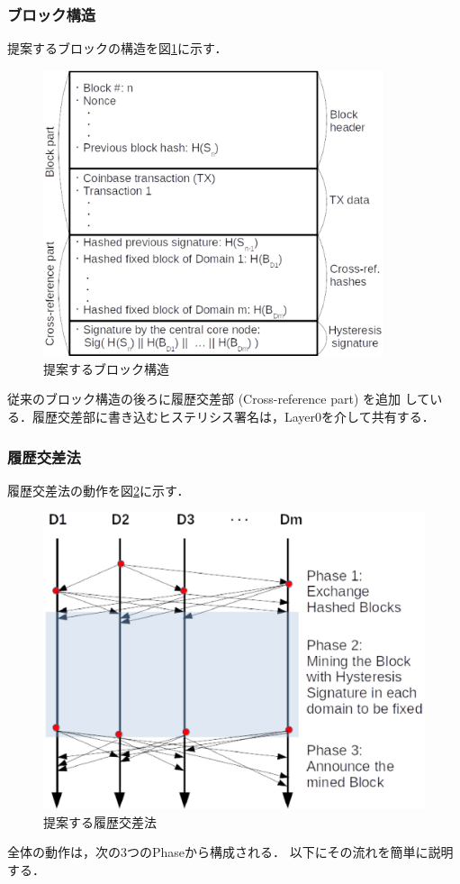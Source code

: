 \documentclass[a4paper,12pt]{jsarticle}
\begin{document}
      \subsubsection{ブロック構造}
提案するブロックの構造を図\ref{fig:block}に示す．
%
\begin{figure}[H]%
  \begin{center}
    \includegraphics[width=100mm]{pht/block_structure.eps}
  \end{center}
  \caption{提案するブロック構造}
  \label{fig:block}
\end{figure}
%
従来のブロック構造の後ろに履歴交差部 (Cross-reference part) を追加
している．履歴交差部に書き込むヒステリシス署名は，Layer0を介して共有する．

      \subsubsection{履歴交差法}
履歴交差法の動作を図\ref{fig:cross-ref}に示す．
%
\begin{figure}[H]%
  \begin{center}
    \includegraphics[width=120mm]{pht/time_sequence-algorithm1.eps}
  \end{center}
  \caption{提案する履歴交差法}
  \label{fig:cross-ref}
\end{figure}
%
全体の動作は，次の3つのPhaseから構成される．
以下にその流れを簡単に説明する．
\end{document}
